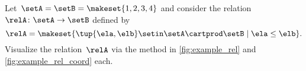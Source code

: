 \vfill
\begin{gradedexercise}
    \label{ex:visualize-leq-relation}
    Let~$\setA = \setB = \makeset{1, 2, 3, 4 }$ and consider the relation~$\relA \colon \setA \to  \setB$ defined by
    \begin{equation*}
        \relA = \makeset{ \tup{\ela,\elb} \setin \setA \cartprod \setB \mid \ela \leq \elb }.
    \end{equation*}
    Visualize the relation~$\relA$ via the method in \cref{fig:example_rel} and \cref{fig:example_rel_coord} each.
\end{gradedexercise}

